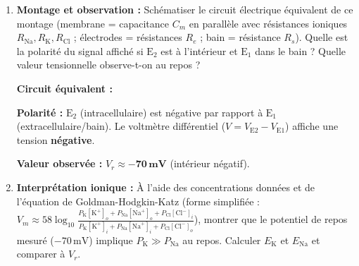 \documentclass[11pt]{article}
\begin{document}
\begin{exercice}
\begin{enumerate}
\item \textbf{Montage et observation :} Schématiser le circuit électrique équivalent de ce montage (membrane = capacitance $C_m$ en parallèle avec résistances ioniques $R_{\text{Na}}, R_{\text{K}}, R_{\text{Cl}}$ ; électrodes = résistances $R_e$ ; bain = résistance $R_s$). Quelle est la polarité du signal affiché si $\text{E}_2$ est à l'intérieur et $\text{E}_1$ dans le bain ? Quelle valeur tensionnelle observe-t-on au repos ?
\par \textbf{Circuit équivalent :} 
\begin{center}
\end{center}
\par \textbf{Polarité :} $\text{E}_2$ (intracellulaire) est négative par rapport à $\text{E}_1$ (extracellulaire/bain). Le voltmètre différentiel ($V = V_{\text{E2}} - V_{\text{E1}}$) affiche une tension \textbf{négative}.
\par \textbf{Valeur observée :} $V_r \approx \mathbf{-70\,\text{mV}}$ (intérieur négatif).
\item \textbf{Interprétation ionique :} À l'aide des concentrations données et de l'équation de Goldman-Hodgkin-Katz (forme simplifiée : $V_m \approx 58 \log_{10} \frac{P_{\text{K}}[\text{K}^+]_o + P_{\text{Na}}[\text{Na}^+]_o + P_{\text{Cl}}[\text{Cl}^-]_i}{P_{\text{K}}[\text{K}^+]_i + P_{\text{Na}}[\text{Na}^+]_i + P_{\text{Cl}}[\text{Cl}^-]_o}$), montrer que le potentiel de repos mesuré ($-70\,\text{mV}$) implique $P_{\text{K}} \gg P_{\text{Na}}$ au repos. Calculer $E_{\text{K}}$ et $E_{\text{Na}}$ et comparer à $V_r$.

\end{enumerate}
\end{exercice}
\end{document}
